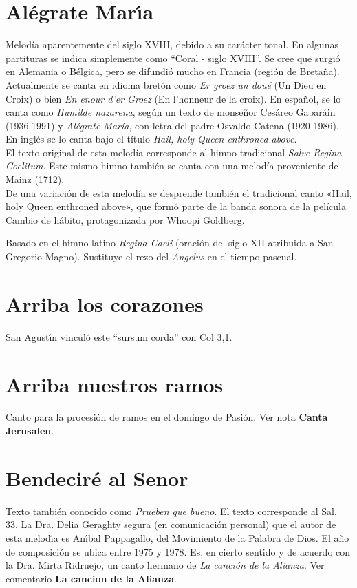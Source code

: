 \documentclass[landscape,12pt]{report}
\begin{document}
\section*{\small Al\'egrate Mar\'\i a} \noindent\footnotesize 
Melodía aparentemente del siglo XVIII, debido a su carácter tonal. En algunas 
partituras se indica simplemente como ``Coral - siglo XVIII''. Se cree que 
surgió en Alemania o Bélgica, pero se difundió mucho en Francia (región de 
Bretaña). Actualmente se canta en idioma bretón como \textit{Er groez un doué} 
(Un Dieu en Croix) o bien \textit{En enour d'er Groez} (En l'honneur de la 
croix). En español, se lo canta como \textit{Humilde nazarena}, según un texto 
de monseñor Cesáreo Gabaráin (1936-1991) y \textit{Alégrate María}, con letra 
 del padre Osvaldo Catena (1920-1986). En inglés se lo canta bajo el título 
\textit{Hail, holy Queen enthroned above}. \\

\noindent El texto original de esta melodía corresponde al himno tradicional 
\textit{Salve Regina Coelitum}. Este mismo himno también se canta con una 
melodía proveniente de Mainz (1712). \\

De una variación de esta melodía se desprende también el tradicional
canto «Hail, holy Queen enthroned above», que formó parte de la banda
sonora de la película Cambio de hábito, protagonizada por Whoopi
Goldberg.

\noindent Basado en el himno latino \textit{Regina Caeli} (oraci\'on del siglo 
XII atribuida a San Gregorio Magno). Sustituye el rezo del \textit{Angelus} en 
el tiempo pascual.


\section*{\small Arriba los corazones} \noindent\footnotesize San Agust\'\i n vincul\'o este ``sursum corda'' con Col 3,1.
\section*{\small Arriba nuestros ramos} \noindent\footnotesize Canto para la procesi\'on de ramos en el domingo de Pasi\'on. Ver nota \textbf{Canta Jerusalen}.
\section*{\small Bendeciré al Senor} \noindent\footnotesize Texto tambi\'en conocido como \textit{Prueben que bueno}. El texto corresponde al Sal. 33. La Dra. Delia Geraghty segura (en comunicaci\'on personal) que el autor de esta melod\'\i a es An\'\i bal Pappagallo, del Movimiento de la Palabra de Dios. El a\~no de composici\'on se ubica entre 1975 y 1978. Es, en cierto sentido y de acuerdo con la Dra. Mirta Ridruejo, un canto hermano de \textit{La canci\'on de la Alianza}. Ver comentario \textbf{La cancion de la Alianza}.   
\end{document}
